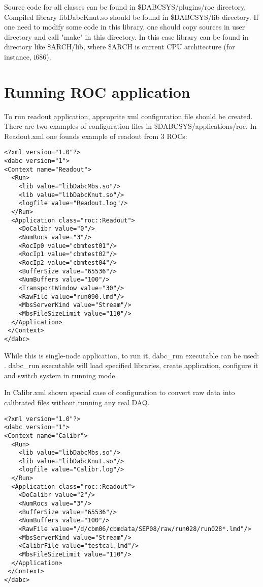 Source code for all classes can be found in \$DABCSYS/plugins/roc directory. 
Compiled library libDabcKnut.so should be found in \$DABCSYS/lib directory.
If one need to modify some code in this library, one should copy sources in 
user directory and call "make" in this directory. In this case library can be found
in directory like \$ARCH/lib, where \$ARCH is current CPU architecture (for instance, i686).

 
\section{Running ROC application}

To run readout application, approprite xml configuration file should be created.
There are two examples of configuration files in \$DABCSYS/applications/roc.
In Readout.xml one founds example of readout from 3 ROCs: 

\begin{verbatim}
<?xml version="1.0"?>
<dabc version="1">
<Context name="Readout">
  <Run>
    <lib value="libDabcMbs.so"/>
    <lib value="libDabcKnut.so"/>
    <logfile value="Readout.log"/>
  </Run>
  <Application class="roc::Readout">
    <DoCalibr value="0"/>
    <NumRocs value="3"/>
    <RocIp0 value="cbmtest01"/>
    <RocIp1 value="cbmtest02"/>
    <RocIp2 value="cbmtest04"/>
    <BufferSize value="65536"/>
    <NumBuffers value="100"/>
    <TransportWindow value="30"/>
    <RawFile value="run090.lmd"/>
    <MbsServerKind value="Stream"/>
    <MbsFileSizeLimit value="110"/>
  </Application>
 </Context>
</dabc>
\end{verbatim}

While this is single-node application, to run it, dabc\_run executable can be used:
. dabc\_run executable will load specified libraries,
create application, configure it and switch system in running mode.   

In Calibr.xml shown special case of configuration to convert raw data 
into calibrated files without running any real DAQ. 

\begin{verbatim}
<?xml version="1.0"?>
<dabc version="1">
<Context name="Calibr">
  <Run>
    <lib value="libDabcMbs.so"/>
    <lib value="libDabcKnut.so"/>
    <logfile value="Calibr.log"/>
  </Run>
  <Application class="roc::Readout">
    <DoCalibr value="2"/>
    <NumRocs value="3"/>
    <BufferSize value="65536"/>
    <NumBuffers value="100"/>
    <RawFile value="/d/cbm06/cbmdata/SEP08/raw/run028/run028*.lmd"/>
    <MbsServerKind value="Stream"/>
    <CalibrFile value="testcal.lmd"/>
    <MbsFileSizeLimit value="110"/>
  </Application>
 </Context>
</dabc>
\end{verbatim}


 